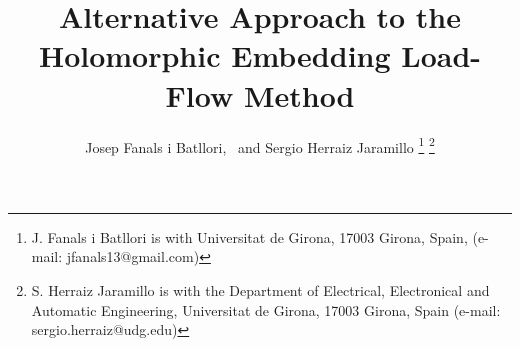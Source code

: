 \documentclass[journal]{IEEEtran}
\begin{document}
%
\title{Alternative Approach to the Holomorphic Embedding Load-Flow Method}
%
%
%

\author{Josep Fanals i Batllori,~
       and Sergio Herraiz Jaramillo%
\thanks{J. Fanals i Batllori is with Universitat de Girona, 17003 Girona, Spain, (e-mail: jfanals13@gmail.com)}%
\thanks{S. Herraiz Jaramillo is with the Department of Electrical, Electronical and Automatic Engineering, Universitat de Girona, 17003 Girona, Spain (e-mail: sergio.herraiz@udg.edu)}}

% 
%
\end{document}
